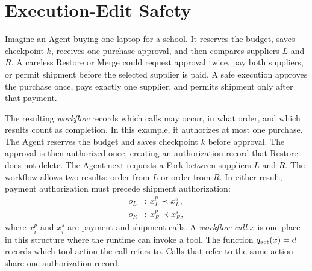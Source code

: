 \section{Execution-Edit Safety}
\label{sec:lifecycle}

Imagine an Agent buying one laptop for a school.
It reserves the budget, saves checkpoint \(k\), receives one purchase approval, and then compares suppliers \(L\) and \(R\).
A careless Restore or Merge could request approval twice, pay both suppliers, or permit shipment before the selected supplier is paid.
A safe execution approves the purchase once, pays exactly one supplier, and permits shipment only after that payment.

The resulting \emph{workflow} records which calls may occur, in what order, and which results count as completion.
In this example, it authorizes at most one purchase.
The Agent reserves the budget and saves checkpoint \(k\) before approval.
The approval is then authorized once, creating an authorization record that Restore does not delete.
The Agent next requests a Fork between suppliers \(L\) and \(R\).
The workflow allows two results: order from \(L\) or order from \(R\).
In either result, payment authorization must precede shipment authorization:
\begin{equation}
\label{eq:running-results}
\begin{split}
 o_L&:\ x_L^p\prec x_L^s,\\
 o_R&:\ x_R^p\prec x_R^s ,
\end{split}
\end{equation}
where \(x_i^p\) and \(x_i^s\) are payment and shipment calls.
A \emph{workflow call} \(x\) is one place in this structure where the runtime can invoke a tool.
The function \(q_{\rm act}(x)=d\) records which tool action the call refers to.
Calls that refer to the same action share one authorization record.

